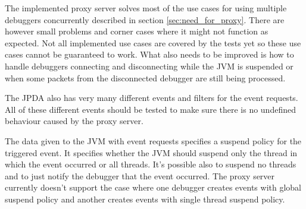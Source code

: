 \documentclass[..thesis.tex]{subfiles}
\begin{document}
The implemented proxy server solves most of the use cases for using multiple debuggers concurrently described in section \ref{sec:need_for_proxy}.
There are however small problems and corner cases where it might not function as expected.
Not all implemented use cases are covered by the tests yet so these use cases cannot be guaranteed to work.
What also needs to be improved is how to handle debuggers connecting and disconnecting while the JVM is suspended or when some packets from the disconnected debugger are still being processed.

The JPDA also has very many different events and filters for the event requests.
All of these different events should be tested to make sure there is no undefined behaviour caused by the proxy server.

The data given to the JVM with event requests specifies a suspend policy for the triggered event.
It specifies whether the JVM should suspend only the thread in which the event occurred or all threads.
It's possible also to suspend no threads and to just notify the debugger that the event occurred.
The proxy server currently doesn't support the case where one debugger creates events with global suspend policy and another creates events with single thread suspend policy.
\end{document}
